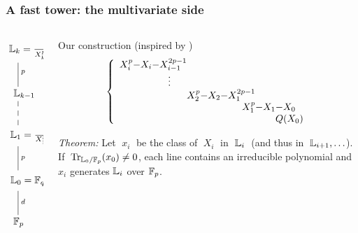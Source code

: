 \documentclass[10pt,usepdftitle=false]{beamer}
\begin{document}
\begin{frame}
  \frametitle{A fast tower: the multivariate side}

  \vspace{-2mm}

  \begin{columns}
    \begin{column}{0.3\textwidth}
      \Large$\xymatrix{
          *+[r]{\LK_k = \frac{\LK_{k-1}[X_k]}{X_k^p-X_k-x_{k-1}^{2p-1}}}\ar@{-}[d]^p\\
          *+[r]{\LK_{k-1}} \ar@{--}[d]\\
          *+[r]{\LK_1 = \frac{\LK_0[X_1]}{X_1^p-X_1-x_0}} \ar@{-}[d]^p\\
          *+[r]{\LK_0 = \F_q = \frac{\F_p[X_0]}{Q(X_0)}} \ar@{-}[d]^d\\
          *+[r]{\F_p}
        }$
    \end{column}
    \begin{column}{0.65\textwidth}
      \begin{block}{Our construction (inspired by \cite{cantor89})}
        \begin{equation*}
          \left\{
            \begin{array}{r@{}c@{}c@{}c@{}c@{}r@{}c@{}l}
              X^p_i & -X_i & -X_{i-1}^{2p-1}\\
              &&\vdots\\
              &&&X_2^p & -X_2 & -X_1^{2p-1}\\
              &&&&&X_1^p & -X_1 & -X_0\\
              &&&&&&&Q(X_0)
            \end{array}
          \right.
        \end{equation*}


        \emph{Theorem:} Let $\;x_i\;$ be the class of $\;X_i\;$ in
        $\;\mathbb{L}_i\;$ (and thus in $\;\mathbb{L}_{i+1},\ldots$).  If
        $\;\operatorname{Tr}_{\mathbb{L}_0/\mathbb{F}_p}(x_0) \ne 0$, each line contains an
        irreducible polynomial and \alert{$x_i$ generates $\mathbb{L}_i$ over
          $\mathbb{F}_p$.}
      \end{block}
    \end{column}
  \end{columns}
\end{frame}

\end{document}

